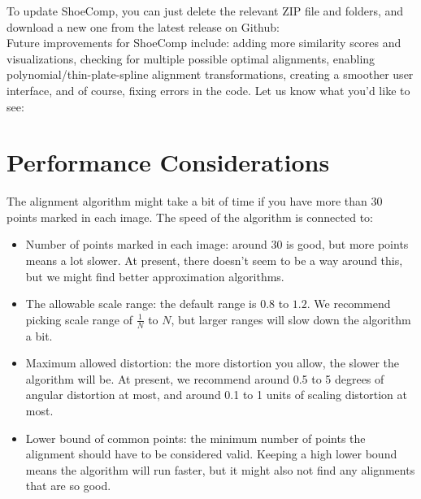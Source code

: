 \documentclass{csafedoc}
\begin{document}
To update ShoeComp, you can just delete the relevant ZIP file and folders, and download a
new one from the latest release on Github: 
\\

Future improvements for ShoeComp include: adding more similarity scores and visualizations,
checking for multiple possible optimal alignments, enabling polynomial/thin-plate-spline
alignment transformations, creating a smoother user interface, and of course, fixing
errors in the code. Let us know what you'd like to see:

\section{Performance Considerations}

The alignment algorithm might take a bit of time if you have more than 30 points marked in
each image. The speed of the algorithm is connected to:

\begin{itemize}
	\item Number of points marked in each image: around 30 is good, but more points means
	      a lot slower. At present, there doesn't seem to be a way around this, but we might find
	      better approximation algorithms.
	\item The allowable scale range: the default range is $0.8$ to $1.2$. We recommend
	      picking scale range of $\frac{1}{N}$ to $N$, but larger ranges will slow down the
	      algorithm a bit.
	\item Maximum allowed distortion: the more distortion you allow, the slower the
	      algorithm will be. At present, we recommend around 0.5 to 5 degrees of angular
	      distortion at most, and around 0.1 to 1 units of scaling distortion at most.
	\item Lower bound of common points: the minimum number of points the alignment should
	      have to be considered valid. Keeping a high lower bound means the algorithm will
	      run faster, but it might also not find any alignments that are so good.
\end{itemize}

\newpage
\nocite{*}

\end{document}
